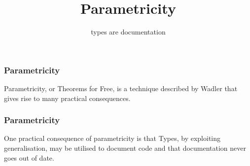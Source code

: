 {


  \begin{frame}[plain] 
  \title{Parametricity}
  \subtitle{types are documentation}
  
  \vspace{3em}

  \begin{TitleBoxParametricity}
    \begin{center}
    {\Large \inserttitle}
    \end{center}
  \end{TitleBoxParametricity}

  \end{frame}
}


\begin{frame}
\frametitle{Parametricity}
\begin{block}{Parametricity, or Theorems for Free, is}
a technique described by Wadler\cite{wadler1989theorems} that gives rise to many practical consequences.
\end{block}
\end{frame}


\begin{frame}
\frametitle{Parametricity}
\begin{block}{One practical consequence of parametricity is that}
Types, by exploiting generalisation, may be utilised to document code and that documentation never goes out of date.
\end{block}
\end{frame}


